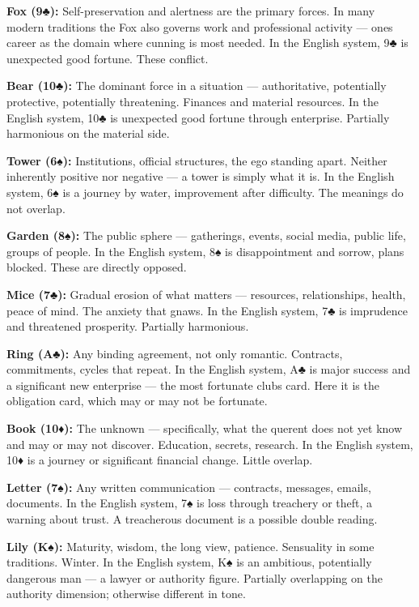 \textbf{Fox (9♣):} Self-preservation and alertness are the primary forces. In many modern traditions the Fox also governs work and professional activity --- one\textquotesingle s career as the domain where cunning is most needed. In the English system, 9♣ is unexpected good fortune. These conflict.

\textbf{Bear (10♣):} The dominant force in a situation --- authoritative, potentially protective, potentially threatening. Finances and material resources. In the English system, 10♣ is unexpected good fortune through enterprise. Partially harmonious on the material side.

\textbf{Tower (6♠):} Institutions, official structures, the ego standing apart. Neither inherently positive nor negative --- a tower is simply what it is. In the English system, 6♠ is a journey by water, improvement after difficulty. The meanings do not overlap.

\textbf{Garden (8♠):} The public sphere --- gatherings, events, social media, public life, groups of people. In the English system, 8♠ is disappointment and sorrow, plans blocked. These are directly opposed.

\textbf{Mice (7♣):} Gradual erosion of what matters --- resources, relationships, health, peace of mind. The anxiety that gnaws. In the English system, 7♣ is imprudence and threatened prosperity. Partially harmonious.

\textbf{Ring (A♣):} Any binding agreement, not only romantic. Contracts, commitments, cycles that repeat. In the English system, A♣ is major success and a significant new enterprise --- the most fortunate clubs card. Here it is the obligation card, which may or may not be fortunate.

\textbf{Book (10♦):} The unknown --- specifically, what the querent does not yet know and may or may not discover. Education, secrets, research. In the English system, 10♦ is a journey or significant financial change. Little overlap.

\textbf{Letter (7♠):} Any written communication --- contracts, messages, emails, documents. In the English system, 7♠ is loss through treachery or theft, a warning about trust. A treacherous document is a possible double reading.

\textbf{Lily (K♠):} Maturity, wisdom, the long view, patience. Sensuality in some traditions. Winter. In the English system, K♠ is an ambitious, potentially dangerous man --- a lawyer or authority figure. Partially overlapping on the authority dimension; otherwise different in tone.

